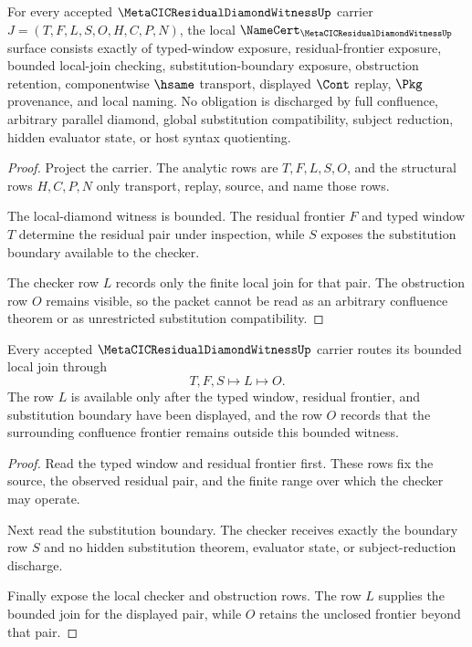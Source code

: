\begin{theorem}
\label{thm:metacic-residual-diamond-witness-obligations}
For every accepted $\MetaCICResidualDiamondWitnessUp$ carrier $J=(T,F,L,S,O,H,C,P,N)$, the local $\NameCert_{\MetaCICResidualDiamondWitnessUp}$ surface consists exactly of typed-window exposure, residual-frontier exposure, bounded local-join checking, substitution-boundary exposure, obstruction retention, componentwise $\hsame$ transport, displayed $\Cont$ replay, $\Pkg$ provenance, and local naming. No obligation is discharged by full confluence, arbitrary parallel diamond, global substitution compatibility, subject reduction, hidden evaluator state, or host syntax quotienting.
\end{theorem}
\begin{proof}
Project the carrier. The analytic rows are $T,F,L,S,O$, and the structural rows $H,C,P,N$ only transport, replay, source, and name those rows.

The local-diamond witness is bounded. The residual frontier $F$ and typed window $T$ determine the residual pair under inspection, while $S$ exposes the substitution boundary available to the checker.

The checker row $L$ records only the finite local join for that pair. The obstruction row $O$ remains visible, so the packet cannot be read as an arbitrary confluence theorem or as unrestricted substitution compatibility.
\end{proof}

\begin{theorem}
\label{thm:metacic-residual-diamond-witness-local-join-route}
Every accepted $\MetaCICResidualDiamondWitnessUp$ carrier routes its bounded local join through
$$
T,F,S \longmapsto L \longmapsto O .
$$
The row $L$ is available only after the typed window, residual frontier, and substitution boundary have been displayed, and the row $O$ records that the surrounding confluence frontier remains outside this bounded witness.
\end{theorem}
\begin{proof}
Read the typed window and residual frontier first. These rows fix the source, the observed residual pair, and the finite range over which the checker may operate.

Next read the substitution boundary. The checker receives exactly the boundary row $S$ and no hidden substitution theorem, evaluator state, or subject-reduction discharge.

Finally expose the local checker and obstruction rows. The row $L$ supplies the bounded join for the displayed pair, while $O$ retains the unclosed frontier beyond that pair.
\end{proof}

